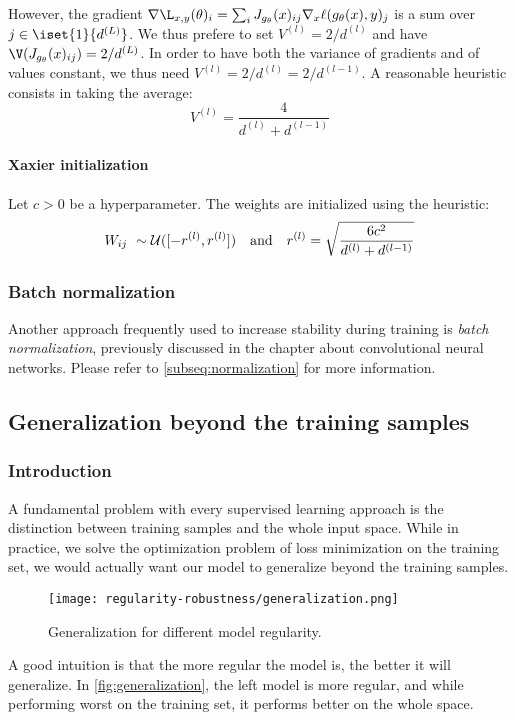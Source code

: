 However, the gradient $\nabla\L_{x,y}(\theta)_i = \sum_iJ_{g_\theta}(x)_{ij}\nabla_x\ell(g_\theta(x),y)_j$ is a sum over $j\in\iset{1}{d^{(L)}}$. We thus prefere to set $V^{(l)}=2/d^{(l)}$ and have $\V(J_{g_\theta}(x)_{ij})=2/d^{(L)}$. In order to have both the variance of gradients and of values constant, we thus need $V^{(l)}=2/d^{(l)}=2/d^{(l-1)}$. A reasonable heuristic consists in taking the average:
\begin{equation*}
    V^{(l)} = \frac{4}{d^{(l)}+d^{(l-1)}}
\end{equation*}

\paragraph*{Xaxier initialization} Let $c>0$ be a hyperparameter. The weights are initialized using the heuristic:
\begin{equation*}
    W_{ij} \sim \mathcal{U}([-r^{(l)}, r^{(l)}]) \quad \textnormal{and} \quad r^{(l)}=\sqrt{\frac{6c^2}{d^{(l)}+d^{(l-1)}}}
\end{equation*}

\subsubsection{Batch normalization}
Another approach frequently used to increase stability during training is \emph{batch normalization}, previously discussed in the chapter about convolutional neural networks. Please refer to \autoref{subseq:normalization} for more information.

\subsection{Generalization beyond the training samples}
\subsubsection{Introduction}
A fundamental problem with every supervised learning approach is the distinction between training samples and the whole input space. While in practice, we solve the optimization problem of loss minimization on the training set, we would actually want our model to generalize beyond the training samples.
\begin{figure}[H]
    \centering
    \texttt{[image: regularity-robustness/generalization.png]}
    \caption{Generalization for different model regularity.}
    \label{fig:generalization}
\end{figure}
A good intuition is that the more regular the model is, the better it will generalize. In \autoref{fig:generalization}, the left model is more regular, and while performing worst on the training set, it performs better on the whole space.

